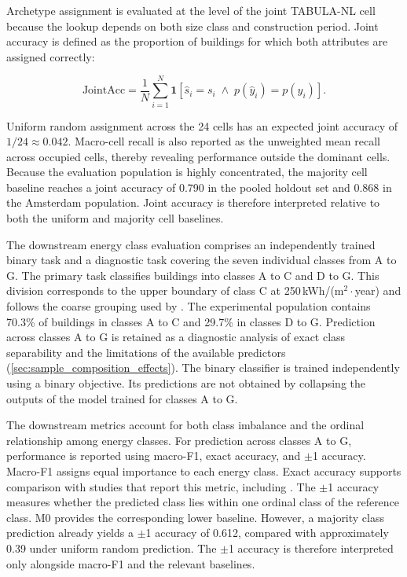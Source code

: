 Archetype assignment is evaluated at the level of the joint TABULA-NL cell because the lookup depends on both size class and construction period.
Joint accuracy is defined as the proportion of buildings for which both attributes are assigned correctly:

\begin{equation}
	\label{eq:joint_acc}
	\mathrm{JointAcc}
	= \frac{1}{N}\sum_{i=1}^{N}
	\mathbf{1}\!\left[\hat{s}_i = s_i \;\land\; p(\hat{y}_i) = p(y_i)\right].
\end{equation}

Uniform random assignment across the 24 cells has an expected joint accuracy of $1/24 \approx 0.042$.
Macro-cell recall is also reported as the unweighted mean recall across occupied cells, thereby revealing performance outside the dominant cells.
Because the evaluation population is highly concentrated, the majority cell baseline reaches a joint accuracy of 0.790 in the pooled holdout set and 0.868 in the Amsterdam population.
Joint accuracy is therefore interpreted relative to both the uniform and majority cell baselines.

The downstream energy class evaluation comprises an independently trained binary task and a diagnostic task covering the seven individual classes from A to G.
The primary task classifies buildings into classes A to C and D to G.
This division corresponds to the upper boundary of class C at 250\,kWh/(m$^2\cdot$year) and follows the coarse grouping used by \textcite{sun2026}.
The experimental population contains 70.3\% of buildings in classes A to C and 29.7\% in classes D to G.
Prediction across classes A to G is retained as a diagnostic analysis of exact class separability and the limitations of the available predictors (\cref{sec:sample_composition_effects}).
The binary classifier is trained independently using a binary objective.
Its predictions are not obtained by collapsing the outputs of the model trained for classes A to G.

The downstream metrics account for both class imbalance and the ordinal relationship among energy classes.
For prediction across classes A to G, performance is reported using macro-F1, exact accuracy, and $\pm$1 accuracy.
Macro-F1 assigns equal importance to each energy class.
Exact accuracy supports comparison with studies that report this metric, including \textcite{hettinga2023}.
The $\pm$1 accuracy measures whether the predicted class lies within one ordinal class of the reference class.
M0 provides the corresponding lower baseline.
However, a majority class prediction already yields a $\pm$1 accuracy of 0.612, compared with approximately 0.39 under uniform random prediction.
The $\pm$1 accuracy is therefore interpreted only alongside macro-F1 and the relevant baselines.

